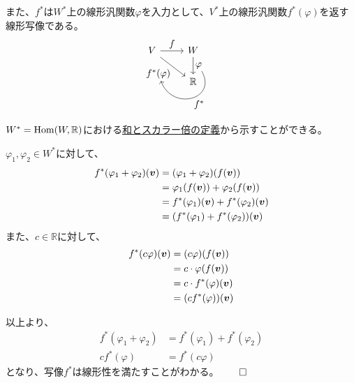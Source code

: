 \documentclass[../../../topic_linear-algebra]{subfiles}
\begin{document}
\br

また、$f^*$は$W^*$上の線形汎関数$\varphi$を入力として、$V^*$上の線形汎関数$f^*(\varphi)$を返す線形写像である。
\begin{equation*}
  \begin{tikzcd}[every label/.append style = {font = \normalsize}]
    V \arrow[r,"f"]\arrow[rd, "f^*(\varphi)"'{name=v}] & W \arrow[d,"\varphi"{name=w}] \arrow[from=w,to=v,out=-60, in=-70,looseness=2,"f^*"]\\
    & \mathbb{R}
  \end{tikzcd}
\end{equation*}

\br

\begin{handout}[補足：なぜ$f^*$は線形写像といえるのか]
  $W^* = \operatorname{Hom}(W, \mathbb{R})$における\hyperref[def:linear-map-addition-scalar]{和とスカラー倍の定義}から示すことができる。
  
  \br
  
  $\varphi_1, \varphi_2 \in W^*$に対して、
  \begin{align*}
    f^*(\varphi_1 + \varphi_2)(\vb*{v}) & = (\varphi_1 + \varphi_2)(f(\vb*{v})) \\
                                & = \varphi_1(f(\vb*{v})) + \varphi_2(f(\vb*{v})) \\
                                & = f^*(\varphi_1)(\vb*{v}) + f^*(\varphi_2)(\vb*{v}) \\
                                & = (f^*(\varphi_1) + f^*(\varphi_2))(\vb*{v})
  \end{align*}
  また、$c \in \mathbb{R}$に対して、
  \begin{align*}
    f^*(c\varphi)(\vb*{v}) & = (c\varphi)(f(\vb*{v})) \\
                            & = c\cdot\varphi(f(\vb*{v})) \\
                            & = c\cdot f^*(\varphi)(\vb*{v}) \\
                            & = (c f^*(\varphi))(\vb*{v})
  \end{align*}
  
  以上より、
  \begin{align*}
    f^*(\varphi_1 + \varphi_2) & = f^*(\varphi_1) + f^*(\varphi_2) \\
    c f^*(\varphi)             & = f^*(c\varphi)
  \end{align*}
  となり、写像$f^*$は線形性を満たすことがわかる。$\qed$
\end{handout}
\end{document}

